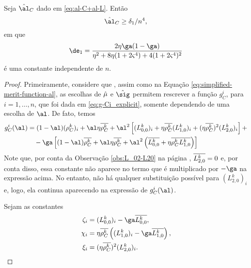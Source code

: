 \begin{lema}\label{lemma:alC_delta-1}
Seja $\nextal_{C}$ dado em \eqref{eq:al-C+al-L}. Então  
\[
\nextal_{C} \geq \delta_{1}/n^{4},
\]
em que 
\begin{equation}
	\label{eq:delta1}
	\de_{1} = \dfrac{2\eta\ga(1-\ga)}{\eta^{2} + 8\eta (1+2\bdxzstar^{4}) + 4 (1+2\bdxzstar^{4})^{2}   }
\end{equation}
é uma constante independente de $n$.
\end{lema}

\begin{proof}
 Primeiramente, considere que , assim como na Equação \eqref{eq:simplified-merit-function-al}, as escolhas de $\hat{\mu}$ e $\nextsig$ permitem rescrever a função $g_C^i $, para $i=1,\ldots,n$, que foi dada em \eqref{eq:g-Ci_explicit}, somente dependendo de uma escolha de $\al$. De fato, temos
\[
\begin{aligned}
{g}_C^i (\al)				& = (1-\al)(\rho_C^k )_i+ \al\eta\rhoCkb + \al^2\left[(L_{0,0}^{k})_i + \eta\rhoCkb  ({L_{1,0}^{k}})_i 
				+ (\eta\rhoCkb )^2(L_{2,0}^{k})_i \right]  + \\
				& \quad -\ga\left[  (1-\al)\rhoCkb  + \al\eta\rhoCkb  + \al^2\left(\dbvec{L_{0,0}^{k}} + \eta\rhoCkb  \dbvec{L_{1,0}^{k}}
\right)  \right]
\end{aligned}
\]
Note que, por conta da Observação \ref{obs:L_02-L20} na página \pageref{obs:L_02-L20}, 
$\overline{L_{2,0}^{k}} = 0$  e, por conta disso, essa constante não aparece no termo que é  multiplicado por $-\ga$ na expressão acima. No entanto, não há qualquer substituição possível para $(L_{2,0}^{k})_{i}$ e, logo, ela continua aparecendo na expressão de ${g}_C^i (\al)$.


Sejam as constantes
\begin{equation}
\label{eq:defin-zeta-i+chi-i+xi-i}
	\begin{aligned}
\zeta_i & = (L_{0,0}^{k})_i - \ga \dbvec{L_{0,0}^{k}}, \\
\chi_i  & = \eta\rhoCkb  \left( ({L_{1,0}^{k}})_i - \ga\dbvec{L_{1,0}^{k}} \right),   \\
\xi_i	& =  (\eta\rhoCkb )^2(L_{2,0}^{k})_i . \\ 	
\end{aligned}
\end{equation}




\end{proof}
